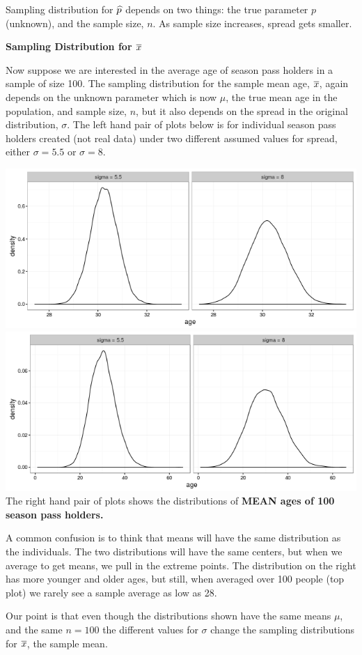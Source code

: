 Sampling distribution for $\widehat{p}$ depends on two things: the true
parameter $p$ (unknown), and the sample size, $n$. As sample size
increases, spread gets smaller. \vspace{1in}

\begin{center}
  {\bf Sampling Distribution for $\overline{x}$}
\end{center}
 Now suppose we are interested in the average age of season pass
 holders in a sample of size 100. The sampling distribution  for the
 sample mean age, $\overline{x}$, 
 again depends on the  unknown parameter which is now $\mu$, the true
 mean age in the population,  and sample size, $n$,
 but it also depends on the spread in the original distribution,
 $\sigma$.  
 The left hand pair of plots below is for individual season pass
 holders created (not real data) under two different assumed values
 for spread, either $\sigma = 5.5$ or $\sigma = 8$.

\includegraphics[width =.48\linewidth]{plots/twoSampDensities4xbar.png}
\hfill
\includegraphics[width =.48\linewidth]{plots/twoSampDensities4x.png}\\

 The right hand pair of plots  shows the distributions of {\bf MEAN ages of 100
   season pass holders.} 

 A common confusion is to think that means will have the same
 distribution as the individuals. The two distributions will have the
 same centers, but when we average to get means, we pull in the
 extreme points.  The distribution on the right has more younger and
 older ages, but still, when averaged over 100 people (top plot) we
 rarely see a sample average as low as 28.

 Our point is that even though the distributions shown have the same
 means $\mu$, and the same $n =  100$ the different values for
 $\sigma$ change the sampling distributions for $\overline{x}$, the sample mean. 



